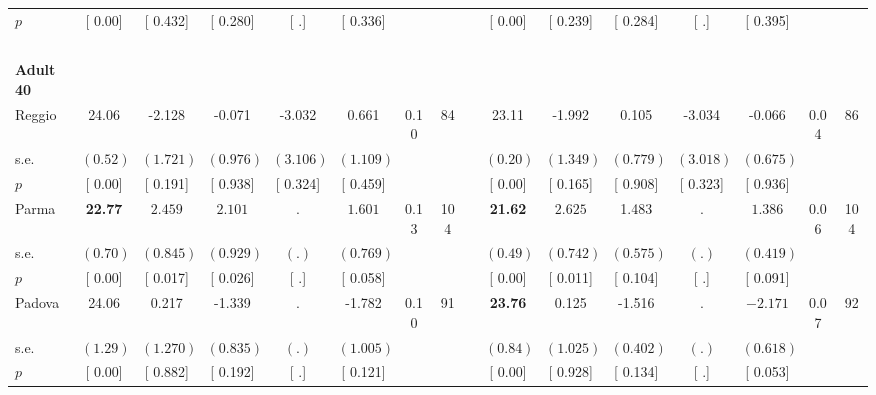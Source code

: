 \begin{longtable}{L{8em} c c c c c c c p{1em} c c c c c c c}
\quad \quad \quad \quad $ p$ & [     0.00] & [    0.432] & [    0.280] & [        .] & [    0.336] & & & & [     0.00] & [    0.239] & [    0.284] & [        .] & [    0.395] & &  \\[1em]
~\\[1em]
\quad \quad \textbf{Adult 40} & & & & & & & & & & & & & & & \\* 
\quad \quad \quad Reggio& 24.06 &    -2.128 &    -0.071 &    -3.032 &     0.661 &      0.10 &        84 & & 23.11 &    -1.992 &     0.105 &    -3.034 &    -0.066 &      0.04 &        86  \\*
\quad \quad \quad \quad s.e.& $ (     0.52)$ & $ (    1.721)$ & $ (    0.976)$ & $ (    3.106)$ & $ (    1.109)$ & & & & $ (     0.20)$ & $ (    1.349)$ & $ (    0.779)$ & $ (    3.018)$ & $ (    0.675)$ & &  \\*
\quad \quad \quad \quad $ p$ & [     0.00] & [    0.191] & [    0.938] & [    0.324] & [    0.459] & & & & [     0.00] & [    0.165] & [    0.908] & [    0.323] & [    0.936] & &  \\[1em]
\quad \quad \quad Parma& \textbf{    22.77} & $ \mathbf{    2.459}$ & $ \mathbf{    2.101}$ &         . & $ \mathbf{    1.601}$ &      0.13 &       104 & & \textbf{    21.62} & $ \mathbf{    2.625}$ &     1.483 &         . & $ \mathbf{    1.386}$ &      0.06 &       104  \\*
\quad \quad \quad \quad s.e.& $ (     0.70)$ & $ (    0.845)$ & $ (    0.929)$ & $ (        .)$ & $ (    0.769)$ & & & & $ (     0.49)$ & $ (    0.742)$ & $ (    0.575)$ & $ (        .)$ & $ (    0.419)$ & &  \\*
\quad \quad \quad \quad $ p$ & [     0.00] & [    0.017] & [    0.026] & [        .] & [    0.058] & & & & [     0.00] & [    0.011] & [    0.104] & [        .] & [    0.091] & &  \\[1em]
\quad \quad \quad Padova& 24.06 &     0.217 &    -1.339 &         . &    -1.782 &      0.10 &        91 & & \textbf{    23.76} &     0.125 &    -1.516 &         . & $ \mathbf{   -2.171}$ &      0.07 &        92  \\*
\quad \quad \quad \quad s.e.& $ (     1.29)$ & $ (    1.270)$ & $ (    0.835)$ & $ (        .)$ & $ (    1.005)$ & & & & $ (     0.84)$ & $ (    1.025)$ & $ (    0.402)$ & $ (        .)$ & $ (    0.618)$ & &  \\*
\quad \quad \quad \quad $ p$ & [     0.00] & [    0.882] & [    0.192] & [        .] & [    0.121] & & & & [     0.00] & [    0.928] & [    0.134] & [        .] & [    0.053] & &  \\[1em]

\end{longtable}
